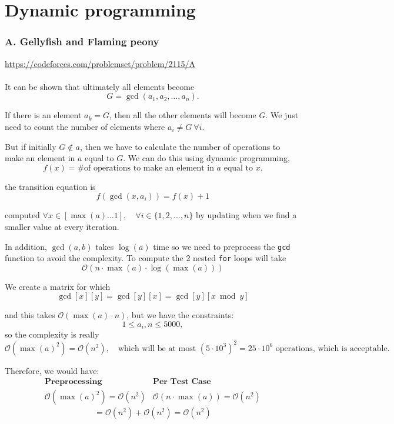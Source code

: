 \chapter{Dynamic programming}

\subsection{A. Gellyfish and Flaming peony}
\url{https://codeforces.com/problemset/problem/2115/A} 
\\
\\
It can be shown that ultimately all elements become 
$$ G = \gcd(a_1, a_2, \ldots, a_n). $$
\begin{obs}
If there is an element \( a_k = G \), then all the other elements will become \( G \).  
We just need to count the number of elements where \( a_i \neq G \ \forall i \).
\end{obs}

But if initially \( G \notin a \), then we have to calculate the number of operations to make an element in \( a \) equal to \( G \).  
We can do this using dynamic programming,
$$ f(x) = \text{\# of operations to make an element in } a \text{ equal to } x. $$

the transition equation is
$$ f(\gcd(x, a_i)) = f(x) + 1 $$

computed \( \forall x \in [\max(a) \dots 1], \quad \forall i \in \{1, 2, \ldots, n\} \)  
by updating when we find a smaller value at every iteration.

In addition, \( \gcd(a, b) \) takes \( \log(a) \) time so we need to preprocess the \texttt{gcd} function to avoid the complexity. To compute the 2 nested \texttt{for} loops will take
\[
\mathcal{O}(n \cdot \max(a) \cdot \log(\max(a)))
\]

We create a matrix for which
$$ \gcd[x][y] = \gcd[y][x] = \gcd[y][x \bmod y] $$

and this takes \( \mathcal{O}(\max(a) \cdot n) \), but we have the constraints:  
$$ 1 \leq a_i, n \leq 5000, $$
so the complexity is really  
\[
\mathcal{O}(\max(a)^2) = \mathcal{O}(n^2), \quad \text{which will be at most } (5 \cdot 10^3)^2 = 25 \cdot 10^6 \text{ operations, which is acceptable.}
\]

Therefore, we would have:
\[
\begin{array}{c|c}
\textbf{Preprocessing} & \textbf{Per Test Case} \\
\hline
\mathcal{O}(\max(a)^2) = \mathcal{O}(n^2) & \mathcal{O}(n \cdot \max(a)) = \mathcal{O}(n^2)
\end{array}
\]
\[
= \mathcal{O}(n^2) + \mathcal{O}(n^2) = \mathcal{O}(n^2)
\]

